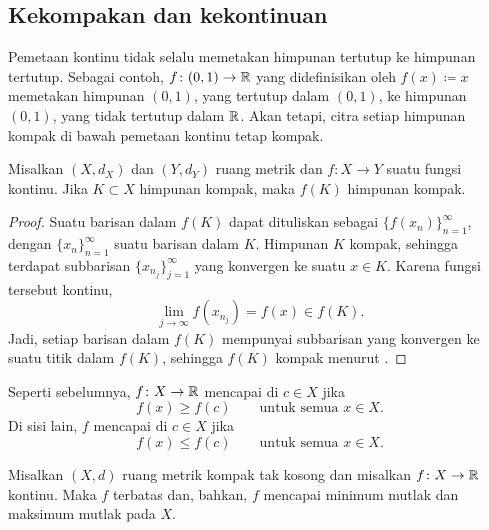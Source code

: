 \subsection{Kekompakan dan kekontinuan}

Pemetaan kontinu tidak selalu memetakan himpunan tertutup ke himpunan tertutup.  Sebagai contoh,
$f \colon (0,1) \to {\mathbb{R}}$ yang didefinisikan oleh $f(x) \coloneqq x$ memetakan himpunan $(0,1)$, yang
tertutup dalam $(0,1)$, ke himpunan $(0,1)$, yang tidak tertutup dalam ${\mathbb{R}}$.
Akan tetapi, citra setiap himpunan kompak di bawah pemetaan kontinu tetap kompak.

\begin{lemma} \label{lemma:continuouscompact}
Misalkan $(X,d_X)$ dan $(Y,d_Y)$ ruang metrik
dan $f \colon X \to Y$ suatu fungsi kontinu.  Jika
$K \subset X$ himpunan kompak, maka $f(K)$ himpunan kompak.
\end{lemma}

\begin{proof}
Suatu barisan dalam $f(K)$ dapat dituliskan sebagai
$\bigl\{ f(x_n) \bigr\}_{n=1}^\infty$, dengan
$\{ x_n \}_{n=1}^\infty$ suatu barisan dalam $K$.  Himpunan $K$ kompak,
sehingga terdapat subbarisan
$\{ x_{n_j} \}_{j=1}^\infty$ yang konvergen ke suatu $x \in K$.
Karena fungsi tersebut kontinu,
\begin{equation*}
\lim_{j\to\infty} f(x_{n_j}) = f(x) \in f(K) .
\end{equation*}
Jadi, setiap barisan dalam $f(K)$ mempunyai subbarisan yang konvergen ke
suatu titik dalam $f(K)$, sehingga $f(K)$ kompak menurut .
\end{proof}

Seperti sebelumnya, $f \colon X \to {\mathbb{R}}$ mencapai
\emph{} di $c \in X$ jika
\begin{equation*}
f(x) \geq f(c) \qquad \text{untuk semua } x \in X.
\end{equation*}
Di sisi lain, $f$ mencapai
\emph{} di $c \in X$ jika
\begin{equation*}
f(x) \leq f(c) \qquad \text{untuk semua } x \in X.
\end{equation*}

\begin{thm}
Misalkan $(X,d)$ ruang metrik kompak tak kosong
dan misalkan $f \colon X \to {\mathbb{R}}$ kontinu.  Maka
$f$ terbatas dan, bahkan,
$f$ mencapai minimum mutlak dan maksimum mutlak pada $X$.
\end{thm}

